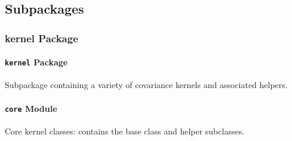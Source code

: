 \documentclass[letterpaper,10pt,english]{sphinxmanual}
\begin{document}
\subsection{Subpackages}
\label{gptools:subpackages}

\subsubsection{kernel Package}
\label{gptools.kernel::doc}\label{gptools.kernel:kernel-package}

\paragraph{\texttt{kernel} Package}
\label{gptools.kernel:id1}\label{gptools.kernel:module-gptools.kernel}
Subpackage containing a variety of covariance kernels and associated helpers.


\paragraph{\texttt{core} Module}
\label{gptools.kernel:core-module}\label{gptools.kernel:module-gptools.kernel.core}
Core kernel classes: contains the base {\hyperref[gptools.kernel:gptools.kernel.core.Kernel]{}} class and helper subclasses.
\end{document}
